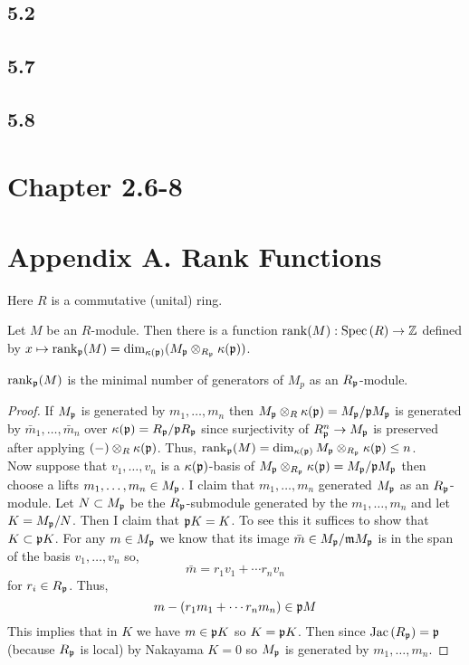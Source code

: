 \documentclass[12pt]{article}
\begin{document}
\subsection{5.2}

\subsection{5.7}

\subsection{5.8}

\section{Chapter 2.6-8}

\section{Appendix A. Rank Functions}

\begin{remark}
Here $R$ is a commutative (unital) ring. 
\end{remark}

\begin{definition}
Let $M$ be an $R$-module. Then there is a function $\mathrm{rank}(M) : \mathrm{Spec}\left( R \right) \to \mathbb{Z}$ defined by $x \mapsto \mathrm{rank}_{\mathfrak{p}}(M) = \dim_{\kappa(\mathfrak{p})}(M_{\mathfrak{p}} \otimes_{R_{\mathfrak{p}}} \kappa(\mathfrak{p}))$. 
\end{definition}

\begin{proposition}
$\mathrm{rank}_{\mathfrak{p}}(M)$ is the minimal number of generators of $M_p$ as an $R_{\mathfrak{p}}$-module.
\end{proposition}

\begin{proof}
If $M_{\mathfrak{p}}$ is generated by $m_1, \dots, m_n$ then $M_{\mathfrak{p}} \otimes_R \kappa(\mathfrak{p}) = M_{\mathfrak{p}} / \mathfrak{p} M_{\mathfrak{p}}$ is generated by $\bar{m}_1, \dots, \bar{m}_n$ over $\kappa(\mathfrak{p}) = R_{\mathfrak{p}} / \mathfrak{p} R_{\mathfrak{p}}$ since surjectivity of $R_{\mathfrak{p}}^n \to M_{\mathfrak{p}}$ is preserved after applying $(-) \otimes_R \kappa(\mathfrak{p})$. Thus, $\mathrm{rank}_{\mathfrak{p}}(M) = \dim_{\kappa(\mathfrak{p})} M_{\mathfrak{p}} \otimes_{R_{\mathfrak{p}}} \kappa(\mathfrak{p}) \le n$. 
\bigskip\\
Now suppose that $v_1, \dots, v_n$ is a $\kappa(\mathfrak{p})$-basis of $M_{\mathfrak{p}} \otimes_{R_{\mathfrak{p}}} \kappa(\mathfrak{p}) = M_{\mathfrak{p}} / \mathfrak{p} M_{\mathfrak{p}}$ then choose a lifts $m_1, \dots, m_n \in M_{\mathfrak{p}}$. I claim that $m_1, \dots, m_n$ generated $M_{\mathfrak{p}}$ as an $R_{\mathfrak{p}}$-module. Let $N \subset M_{\mathfrak{p}}$ be the $R_{\mathfrak{p}}$-submodule generated by the $m_1, \dots, m_n$ and let $K = M_{\mathfrak{p}} / N$. Then I claim that $\mathfrak{p} K = K$. To see this it suffices to show that $K \subset \mathfrak{p} K$. For any $m \in M_{\mathfrak{p}}$ we know that its image $\bar{m} \in M_{\mathfrak{p}} / \mathfrak{m} M_{\mathfrak{p}}$ is in the span of the basis $v_1, \dots, v_n$ so,
\[ \bar{m} = r_1 v_1 + \cdots r_n v_n \]
for $r_i \in R_{\mathfrak{p}}$. Thus,
\[ m - (r_1 m_1 + \cdots r_n m_n) \in \mathfrak{p} M \]
This implies that in $K$ we have $m \in \mathfrak{p} K$ so $K = \mathfrak{p} K$. Then since $\mathrm{Jac}\left( R_{\mathfrak{p}} \right) = \mathfrak{p}$ (because $R_{\mathfrak{p}}$ is local) by Nakayama $K = 0$ so $M_{\mathfrak{p}}$ is generated by $m_1, \dots, m_n$. 
\end{proof}
\end{document}
